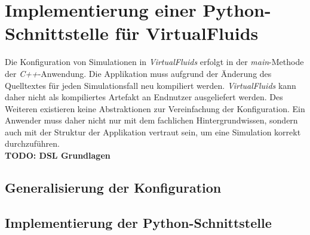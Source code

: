 \chapter{Implementierung einer Python-\newline Schnittstelle für VirtualFluids}

Die Konfiguration von Simulationen in \textit{VirtualFluids} erfolgt in der \textit{main}-Methode der \textit{C++}-Anwendung. Die Applikation muss aufgrund der Änderung des Quelltextes
für jeden Simulationsfall neu kompiliert werden. \textit{VirtualFluids} kann daher nicht als kompiliertes Artefakt an Endnutzer ausgeliefert werden.
Des Weiteren existieren keine Abstraktionen zur Vereinfachung der Konfiguration. Ein Anwender muss daher nicht nur mit dem fachlichen Hintergrundwissen, 
sondern auch mit der Struktur der Applikation vertraut sein, um eine Simulation korrekt durchzuführen.\\

\textbf{TODO: DSL Grundlagen}

\section{Generalisierung der Konfiguration}


\section{Implementierung der Python-Schnittstelle}\cite{Fowler2011}